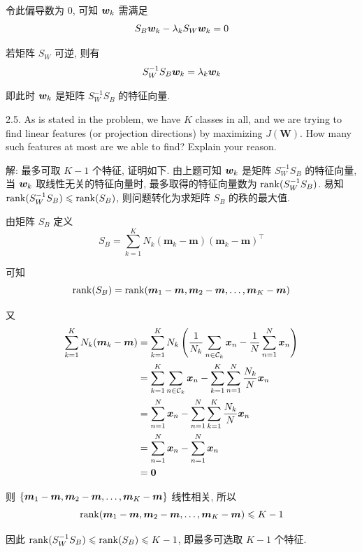 \documentclass{article}
\begin{document}
令此偏导数为 0, 可知 $\bm{w}_k$ 需满足
\begin{equation}
  S_B\bm{w}_k-\lambda_kS_W\bm{w}_k=0
\end{equation}

若矩阵 $S_W$ 可逆, 则有
\begin{equation}
  S_W^{-1}S_B\bm{w}_k=\lambda_k\bm{w}_k
\end{equation}

即此时 $\bm{w}_k$ 是矩阵 $S_W^{-1}S_B$ 的特征向量.

2.5. As is stated in the problem, we have $K$ classes in all, and we are trying to find linear features (or projection directions) by maximizing $J(\bm{W})$. How many such features at most are we able to find? Explain your reason.

解: 最多可取 $K-1$ 个特征, 证明如下. 由上题可知 $\bm{w}_k$ 是矩阵 $S_W^{-1}S_B$ 的特征向量, 当 $\bm{w}_k$ 取线性无关的特征向量时, 最多取得的特征向量数为 $\operatorname{rank}(S_W^{-1}S_B)$. 易知 $\operatorname{rank}(S_W^{-1}S_B)\leqslant\operatorname{rank}(S_B)$, 则问题转化为求矩阵 $S_B$ 的秩的最大值.

由矩阵 $S_B$ 定义
\begin{equation}
  S_B=\sum_{k=1}^{K}N_{k}(\bm{m}_{k}-\bm{m})(\bm{m}_{k}-\bm{m})^{\top}
\end{equation}

可知
\begin{equation}
  \operatorname{rank}(S_B)=\operatorname{rank}(\bm{m}_1-\bm{m},\bm{m}_2-\bm{m},\dots,\bm{m}_K-\bm{m})
\end{equation}

又
\begin{equation}
  \begin{aligned}
    \sum_{k=1}^KN_k(\bm{m}_k-\bm{m})
    &=\sum_{k=1}^KN_k\left(\frac{1}{N_k}\sum_{n\in\mathcal{C}_k}\bm{x}_n-\frac{1}{N}\sum_{n=1}^N\bm{x}_n\right)\\
    &=\sum_{k=1}^K\sum_{n\in\mathcal{C}_k}\bm{x}_n-\sum_{k=1}^K\sum_{n=1}^N\frac{N_k}{N}\bm{x}_n\\
    &=\sum_{n=1}^N\bm{x}_n-\sum_{n=1}^N\sum_{k=1}^K\frac{N_k}{N}\bm{x}_n\\
    &=\sum_{n=1}^N\bm{x}_n-\sum_{n=1}^N\bm{x}_n\\
    &=\bm{0}
  \end{aligned}
\end{equation}

则 $\{\bm{m}_1-\bm{m},\bm{m}_2-\bm{m},\dots,\bm{m}_K-\bm{m}\}$ 线性相关, 所以
\begin{equation}
  \operatorname{rank}(\bm{m}_1-\bm{m},\bm{m}_2-\bm{m},\dots,\bm{m}_K-\bm{m})\leqslant K-1
\end{equation}

因此 $\operatorname{rank}(S_W^{-1}S_B)\leqslant\operatorname{rank}(S_B)\leqslant K-1$, 即最多可选取 $K-1$ 个特征.
\end{document}
